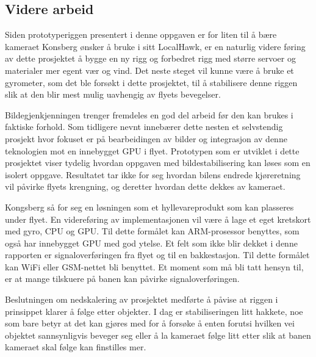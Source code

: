 \subsection{Videre arbeid}
Siden prototyperiggen presentert i denne oppgaven er for liten til å bære kameraet Konsberg ønsker å bruke i sitt LocalHawk, er en naturlig videre føring av dette prosjektet å bygge en ny rigg og forbedret rigg med større servoer og materialer mer egent vær og vind. Det neste steget vil kunne være å bruke et gyrometer, som det ble forsøkt i dette prosjektet, til å stabilisere denne riggen slik at den blir mest mulig uavhengig av flyets bevegelser. 

Bildegjenkjenningen trenger fremdeles en god del arbeid før den kan brukes i faktiske forhold. Som tidligere nevnt innebærer dette nesten et selvstendig prosjekt hvor fokuset er på bearbeidingen av bilder og integrasjon av denne teknologien mot en innebygget GPU i flyet. Prototypen som er utviklet i dette prosjektet viser tydelig hvordan oppgaven med bildestabilisering kan løses som en isolert oppgave. Resultatet tar ikke for seg hvordan bilens endrede kjøreretning vil påvirke flyets krengning, og deretter hvordan dette dekkes av kameraet.

Kongsberg så for seg en løsningen som et hyllevareprodukt som kan plasseres under flyet. En videreføring av implementasjonen vil være å lage et eget kretskort med gyro, CPU og GPU. Til dette formålet kan ARM-prosessor benyttes, som også har innebygget GPU med god ytelse. Et felt som ikke blir dekket i denne rapporten er signaloverføringen fra flyet og til en bakkestasjon. Til dette formålet kan WiFi eller GSM-nettet bli benyttet. Et moment som må bli tatt hensyn til, er at mange tilskuere på banen kan påvirke signaloverføringen.

Beslutningen om nedskalering av prosjektet medførte å påvise at riggen i prinsippet klarer å følge etter objekter. I dag er stabiliseringen litt hakkete, noe som bare betyr at det kan gjøres med for å forsøke å enten forutsi hvilken vei objektet sannsynligvis beveger seg eller å la kameraet følge litt etter slik at banen kameraet skal følge kan finstilles mer.

